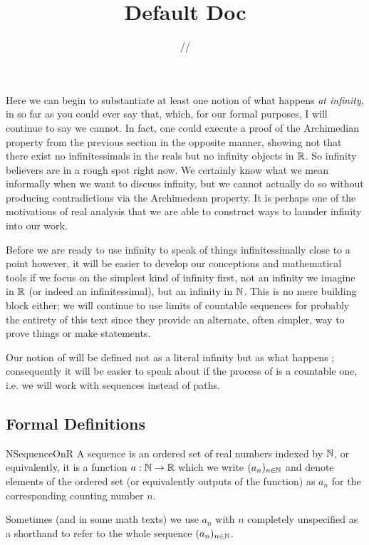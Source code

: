 \documentclass[11pt]{article}
\title{\textbf{Default Doc}}
\date{\the\day/\the\month/\the\year}
\begin{document}
Here we can begin to substantiate at least one notion of what happens \emph{at infinity}, in so far as you could ever say that, which, for our formal purposes, I will continue to say we cannot. In fact, one could execute a proof of the Archimedian property from the previous section in the opposite manner, showing not that there exist no infinitessimals in the reals but no infinity objects in $\mathbb{R}$. So infinity believers are in a rough spot right now. We certainly know what we mean informally when we want to discuss infinity, but we cannot actually do so without producing contradictions via the Archimedean property. It is perhaps one of the motivations of real analysis that we are able to construct ways to launder infinity into our work.

Before we are ready to use infinity to speak of things infinitessimally close to a point however, it will be easier to develop our conceptions and mathematical tools if we focus on the simplest kind of infinity first, not an infinity we imagine in $\mathbb{R}$ (or indeed an infinitessimal), but an infinity in $\mathbb{N}$. This is no mere building block either; we will continue to use limits of countable sequences for probably the entirety of this text since they provide an alternate, often simpler, way to prove things or make statements.

Our notion of  will be defined not as a literal infinity but as what happens ; consequently it will be easier to speak about  if the process of  is a countable one, i.e. we will work with sequences instead of paths.

\subsection{Formal Definitions}

\begin{label definition}{NSequenceOnR}
A sequence is an ordered set of real numbers indexed by $\mathbb{N}$, or equivalently, it is a function $a: \mathbb{N} \to \mathbb{R}$ which we write $(a_n)_{n \in \mathbb{N}}$ and denote elements of the ordered set (or equivalently outputs of the function) as $a_n$ for the corresponding counting number $n$.

Sometimes (and in some math texts) we use $a_n$ with $n$ completely unspecified as a shorthand to refer to the whole sequence $(a_n)_{n\in \mathbb{N}}$.
\end{label definition}
\end{document}
